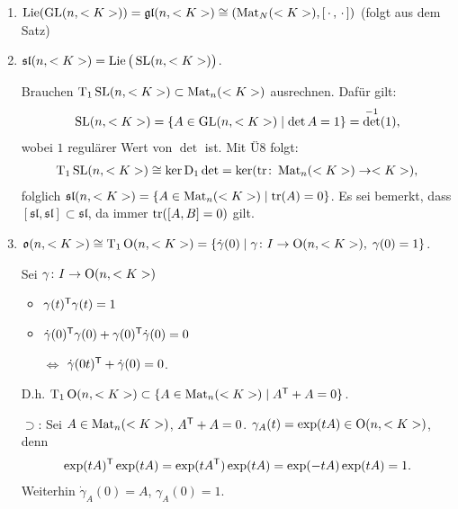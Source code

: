 \begin{example}
	\begin{enumerate}[label={(\arabic*)}]
		\item $\operatorname{Lie}(\operatorname{GL}(n,<K>)) = \mathfrak {gl}(n,<K>)\cong (\operatorname{Mat}_N(<K>),[\,\cdot\,,\,\cdot\,])$ (folgt aus dem Satz)
		\item $\mathfrak{sl}(n,<K>) = \operatorname{Lie}\big(\operatorname{SL}(n,<K>)\big)$.
		
		Brauchen $\operatorname{T}_1 \operatorname{SL}(n,<K>)\subset \operatorname{Mat}_n(<K>)$ ausrechnen. Dafür gilt: \begin{align*}
			\operatorname{SL}(n,<K>) = \{A\in\operatorname{GL}(n,<K>)\mid \det A = 1\} = \det^{-1}(1),
		\end{align*}
		wobei $1$ regulärer Wert von $\det$ ist. Mit Ü8 folgt: \begin{align*}
			\operatorname{T}_1 \operatorname{SL}(n,<K>)\cong\ker \operatorname{D}_1\det = \ker(\operatorname{tr}\colon \operatorname{Mat}_n(<K>)\to<K>),
		\end{align*}
		folglich $\mathfrak{sl}(n,<K>) = \{A\in\operatorname{Mat}_n(<K>)\mid \operatorname{tr}(A) = 0\}$. Es sei bemerkt, dass $[\mathfrak{sl},\mathfrak{sl}] \subset\mathfrak{sl}$, da immer $\operatorname{tr}([A,B]=0)$ gilt.
		
		\item $\mathfrak o(n,<K>) \cong \operatorname{T}_1 \operatorname{O}(n,<K>) = \{\dot\gamma(0)\mid \gamma\colon I\to\operatorname{O}(n,<K>),\;\gamma(0) = 1\}$.
		
		Sei $\gamma\colon I\to\operatorname{O}(n,<K>)$\begin{itemize}[label={$\Rightarrow$},topsep=0pt]
			\item $\gamma(t)^\mathsf{T}\gamma(t) = 1$ 
			\item $\dot\gamma(0)^\mathsf{T}\gamma(0) + \gamma(0)^\mathsf{T}\dot\gamma(0)=0$
			\item[$\Leftrightarrow$] $\dot\gamma(0t)^\mathsf{T}+\dot\gamma(0) = 0$.
		\end{itemize}
		D.h. $\operatorname{T}_1 \operatorname{O}(n,<K>)\subset \{A\in\operatorname{Mat}_n(<K>)\mid A^\mathsf{T}+A=0\}$.
		
		$\boldsymbol\supset$: Sei $A\in\operatorname{Mat}_n(<K>)$, $A^\mathsf{T}+A=0$. $\gamma_A(t) = \exp(tA)\in\operatorname{O}(n,<K>)$, denn \begin{align*}
			\exp(tA)^\mathsf{T}\exp(tA) = \exp(tA^\mathsf{T})\exp(tA) = \exp(-tA)\exp(tA) = 1.
		\end{align*}
		Weiterhin $\dot\gamma_A(0) = A$, $\gamma_A(0) = 1$.
		

\end{enumerate}
\end{example}
